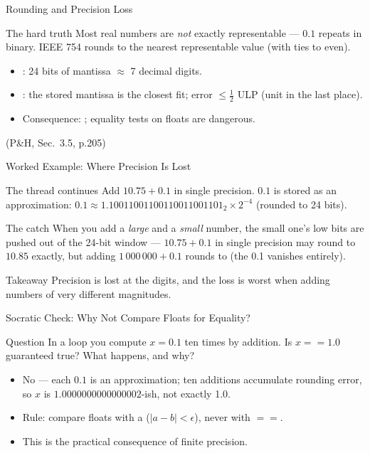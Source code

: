 \documentclass[aspectratio=169]{beamer}
\begin{document}
\begin{frame}{Rounding and Precision Loss}
  \begin{block}{The hard truth}
    Most real numbers are \emph{not} exactly representable --- $0.1$ repeats
    in binary. IEEE 754 rounds to the nearest representable value (with ties to
    even).
  \end{block}
  \begin{itemize}
    \item {}: 24 bits of mantissa $\approx$ 7 decimal digits.
    \item {}: the stored mantissa is the closest fit; error
      $\le \tfrac{1}{2}$ ULP (unit in the last place).
    \item Consequence: ; equality
      tests on floats are dangerous.
  \end{itemize}
  (P\&H, Sec.~3.5, p.205) \cite{PattersonHennessy2017_computer_organization_design}
\end{frame}

\begin{frame}{Worked Example: Where Precision Is Lost}
  \begin{block}{The thread continues}
    Add $10.75 + 0.1$ in single precision. $0.1$ is stored as an approximation:
    $0.1 \approx 1.10011001100110011001101_2 \times 2^{-4}$ (rounded to 24
    bits).
  \end{block}
  \begin{exampleblock}{The catch}
    When you add a \emph{large} and a \emph{small} number, the small one's low
    bits are pushed out of the 24-bit window --- $10.75 + 0.1$ in single
    precision may round to $10.85$ exactly, but adding $1\,000\,000 + 0.1$
    rounds to  (the 0.1 vanishes entirely).
  \end{exampleblock}
  \vspace{0.2cm}
  \begin{alertblock}{Takeaway}
    Precision is lost at the  digits, and the loss is
    worst when adding numbers of very different magnitudes.
  \end{alertblock}
\end{frame}

\begin{frame}{Socratic Check: Why Not Compare Floats for Equality?}
  \begin{alertblock}{Question}
    In a loop you compute $x = 0.1$ ten times by addition. Is $x == 1.0$
    guaranteed true? What happens, and why?
  \end{alertblock}
  \begin{itemize}
    \item No --- each $0.1$ is an approximation; ten additions accumulate
      rounding error, so $x$ is $1.0000000000000002$-ish, not exactly 1.0.
    \item Rule: compare floats with a  ($|a-b| < \epsilon$),
      never with $==$.
    \item This is the practical consequence of finite precision.
  \end{itemize}
\end{frame}
\end{document}
